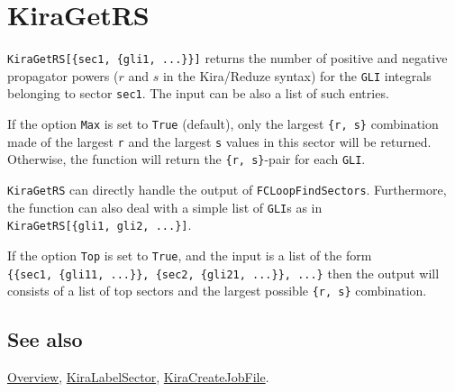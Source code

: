\documentclass[../FeynHelpersManual.tex]{subfiles}
\begin{document}
\begin{Shaded}
\begin{Highlighting}[]
 
\end{Highlighting}
\end{Shaded}

\hypertarget{kiragetrs}{
\section{KiraGetRS}\label{kiragetrs}}

\texttt{KiraGetRS[\allowbreak{}\{\allowbreak{}sec1,\ \allowbreak{}\{\allowbreak{}gli1,\ \allowbreak{}...\}\}]}
returns the number of positive and negative propagator powers (\(r\) and
\(s\) in the Kira/Reduze syntax) for the \texttt{GLI} integrals
belonging to sector \texttt{sec1}. The input can be also a list of such
entries.

If the option \texttt{Max} is set to \texttt{True} (default), only the
largest \texttt{\{\allowbreak{}r,\ \allowbreak{}s\}} combination made of
the largest \texttt{r} and the largest \texttt{s} values in this sector
will be returned. Otherwise, the function will return the
\texttt{\{\allowbreak{}r,\ \allowbreak{}s\}}-pair for each \texttt{GLI}.

\texttt{KiraGetRS} can directly handle the output of
\texttt{FCLoopFindSectors}. Furthermore, the function can also deal with
a simple list of \texttt{GLI}s as in
\texttt{KiraGetRS[\allowbreak{}\{\allowbreak{}gli1,\ \allowbreak{}gli2,\ \allowbreak{}...\}]}.

If the option \texttt{Top} is set to \texttt{True}, and the input is a
list of the form
\texttt{\{\allowbreak{}\{\allowbreak{}sec1,\ \allowbreak{}\{\allowbreak{}gli11,\ \allowbreak{}...\}\},\ \allowbreak{}\{\allowbreak{}sec2,\ \allowbreak{}\{\allowbreak{}gli21,\ \allowbreak{}...\}\},\ \allowbreak{}...\}}
then the output will consists of a list of top sectors and the largest
possible \texttt{\{\allowbreak{}r,\ \allowbreak{}s\}} combination.

\subsection{See also}

\hyperlink{toc}{Overview}, \hyperlink{kiralabelsector}{KiraLabelSector},
\hyperlink{kiracreatejobfile}{KiraCreateJobFile}.
\end{document}
